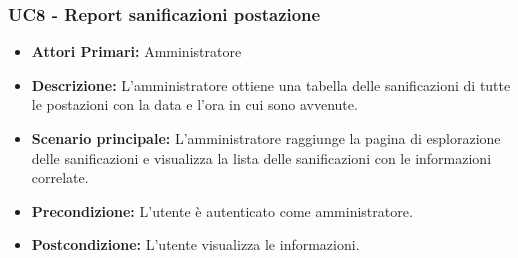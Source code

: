 \subsubsection{ UC8 - Report sanificazioni postazione}
\begin{itemize}
           	\item\textbf{Attori Primari:} 
           	Amministratore
           	\item\textbf{Descrizione:} 
           	L'amministratore ottiene una tabella delle sanificazioni di tutte le postazioni con la data e l'ora in cui sono avvenute.
           	\item\textbf{Scenario principale:} 
           	L'amministratore raggiunge la pagina di esplorazione delle sanificazioni e visualizza la lista delle sanificazioni con le informazioni correlate.
           	\item\textbf{Precondizione:} 
           	L'utente è autenticato come amministratore.
           	\item\textbf{Postcondizione:}
           	L'utente visualizza le informazioni.
\end{itemize}

